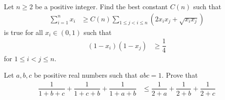 \documentclass{subfile}
\begin{document}
		\begin{problem}
			Let $n\geq2$ be a positive integer. Find the best constant $C(n)$ such that
				\begin{align*}
					\sum_{i=1}^{n}x_{i}
						& \geq C(n)\sum_{1\leq j<i\leq n}(2x_{i}x_{j}+\sqrt{x_{i}x_{j}})
				\end{align*}
			is true for all $x_i\in(0,1)$ such that
				\begin{align*}
					(1-x_{i})(1-x_{j})
						& \geq \dfrac{1}{4}
				\end{align*}
			for $1\leq i<j\leq n$.
		\end{problem}
	
		\begin{problem}[$1997$, problem $1$]
			Let $a,b,c$ be positive real numbers such that $abc=1$. Prove that
				\begin{align*}
					\dfrac{1}{1+b+c}+\dfrac{1}{1+c+b}+\dfrac{1}{1+a+b}
						& \leq \dfrac{1}{2+a}+\dfrac{1}{2+b}+\dfrac{1}{2+c}
				\end{align*}
		\end{problem}
\end{document}
